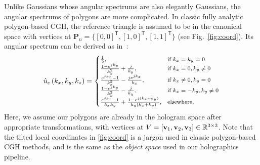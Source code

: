 Unlike Gaussians whose angular spectrums are also elegantly Gaussians, the angular spectrums of polygons are more complicated. In classic fully analytic polygon-based CGH, the reference triangle is assumed to be in the canonical space with vertices at $\mathbf{P}_n = \{[0,0]^\mathsf{T}, [1, 0]^\mathsf{T}, [1,1]^\mathsf{T}\}$ (see Fig.~\ref{fig:coord}). Its angular spectrum can be derived as in~\cite{kim2008mathematical, ahrenberg2008computer, zhang2022polygon}:
\begin{align}
    {\footnotesize
\hat{u}_c\left(k_x, k_y, k_z\right) = \begin{cases}
    \frac{1}{2}, & \text{if } k_x = k_y = 0 \\
    \frac{1 - e^{jk_y}}{k_y^2} + \frac{j}{k_y}, & \text{if } k_x = 0, k_y \neq 0 \\
    \frac{e^{jk_x} - 1}{k_x^2} - \frac{je^{jk_x}}{k_x}, & \text{if } k_x \neq 0, k_y = 0 \\
    \frac{1 - e^{jk_y}}{k_y^2} - \frac{j}{k_y}, &  \text{if } k_x = -k_y, k_y \neq 0 \\
    \frac{e^{jk_x} - 1}{k_x k_y} + \frac{1 - e^{j(k_x + k_y)}}{k_y (k_x + k_y)}, & \text{elsewhere}, \\
\end{cases}}
    \label{eq:ref_polygon}
\end{align}
Here, we assume our polygons are already in the hologram space after appropriate transformations, with vertices at $V = [\mathbf{v}_1, \mathbf{v}_2, \mathbf{v}_3] \in \mathbb{R}^{3 \times 3}$. Note that the tilted local coordinates in \ref{fig:coord} is a jargon used in classic polygon-based CGH methods, and is the same as the \textit{object space} used in our holographics pipeline.

